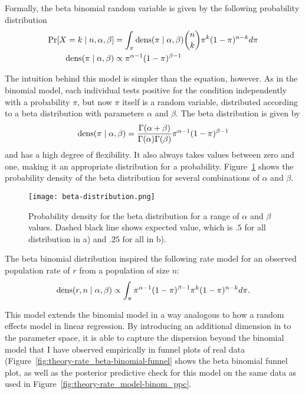 Formally, the beta binomial random variable is given by the following
probability distribution
\begin{align*}
\operatorname{Pr}[X = k\;|\; n, \alpha, \beta] 
  &= \int_{\pi}\operatorname{dens}(\pi\;|\; \alpha, \beta) \binom{n}{k}\pi^k(1-\pi)^{n-k}
d\pi\\
\operatorname{dens}(\pi\;|\; \alpha, \beta) &\propto \pi^{\alpha-1}(1-\pi)^{\beta-1}
\end{align*}

The intuition behind this model is simpler than the equation, however.
As in the binomial model, each individual tests positive for the condition independently
with a probability $\pi$, but now $\pi$ itself is a random variable,
distributed according to a beta distribution with parameters $\alpha$
and $\beta$. The beta distribution is given by 
\[
\operatorname{dens}(\pi\;|\; \alpha, \beta) =
\frac{\Gamma(\alpha+\beta)}{\Gamma(\alpha)\Gamma(\beta)}\pi^{\alpha-1}(1-\pi)^{\beta-1}
\]
and has a high degree of flexibility.  It also always takes values
between zero and one, making it an appropriate distribution for a
probability.  Figure~\ref{fig:theory-rate_model-beta} shows the
probability density of the beta distribution for several combinations
of $\alpha$ and $\beta$.
\begin{figure}[ht]
\begin{center}
\texttt{[image: beta-distribution.png]}
\end{center}
\caption{Probability density for the beta distribution for a range of
  $\alpha$ and $\beta$ values. Dashed black line shows expected value,
which is $.5$ for all distribution in a) and $.25$ for all in b).}
\label{fig:theory-rate_model-beta}
\end{figure}

The beta binomial distribution inspired the following rate model for
an observed population rate of $r$ from a population of size $n$:
\[
\operatorname{dens}(r,n\;|\; \alpha, \beta) \propto \int_{\pi}
\pi^{\alpha-1}(1-\pi)^{\beta-1} \pi^k (1-\pi)^{n-k}
d\pi.
\]

This model extends the binomial model in a way analogous to how a
random effects model in linear regression.  By introducing an
additional dimension in to the parameter space, it is able to capture
the dispersion beyond the binomial model that I have observed
empirically in funnel plots of real data
(Figure~\ref{fig:theory-rate_beta-binomial-funnel} shows the beta
binomial funnel plot, as well as the posterior predictive check for
this model on the same data as used in
Figure~\ref{fig:theory-rate_model-binom_ppc}.

